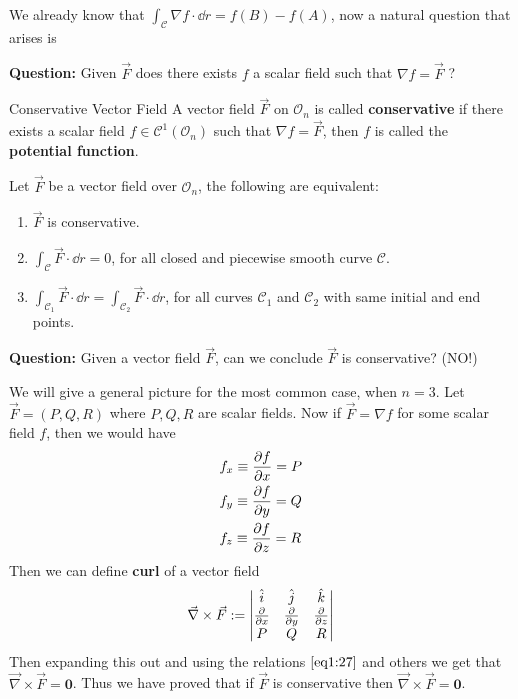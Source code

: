 \documentclass[Analysis-3]{subfiles}
\begin{document}
We already know that $\int_{\mathcal{C}} \nabla f \cdot \dd r = f(B) - f(A)$, now a natural question that arises is 

\textbf{Question:} Given $\vec{F}$ does there exists $f$ a scalar field such that $\nabla f = \vec{F}$ ?  

\begin{Def}{Conservative Vector Field}{}
    A vector field $\vec{F}$ on $\mathcal{O}_n$ is called \textbf{conservative} if there exists a scalar field $f \in \mathscr{C}^1(\mathcal{O}_n)$ such that $\nabla f = \vec{F}$, then $f$ is called the \textbf{potential function}. 
\end{Def}

\begin{Thm}{}{}\label{thm1:27}
    Let $\vec{F}$ be a vector field over $\mathcal{O}_n$, the following are equivalent: 
    \begin{enumerate}
        \item $\vec{F}$ is conservative.
        \item $\int_{\mathcal{C}}\vec{F} \cdot \dd r = 0$, for all closed and piecewise smooth curve $\mathcal{C}$.
        \item $\int_{\mathcal{C}_1} \vec{F} \cdot \dd r = \int_{\mathcal{C}_2} \vec{F} \cdot \dd r$, for all curves $\mathcal{C}_1$ and $\mathcal{C}_2$ with same initial and end points.
    \end{enumerate}
\end{Thm}

\textbf{Question:} Given a vector field $\vec{F}$, can we conclude $\vec{F}$ is conservative? (NO!)

We will give a general picture for the most common case, when $n = 3$. Let $\vec{F} = (P,Q,R)$ where $P,Q,R$ are scalar fields. Now if $\vec{F} = \nabla f$ for some scalar field $f$, then we would have 
\begin{align}\label{eq1:27}
    &f_x \equiv \pdv{f}{x} = P \\ 
    &f_y \equiv \pdv{f}{y} = Q \\ 
    &f_z \equiv \pdv{f}{z} = R
\end{align}
Then we can define \textbf{curl} of a vector field 
\[
    \vec{\nabla} \times \vec{F} := \begin{vmatrix}
        \hat{i} & \hat{j} & \hat{k} \\ 
        \pdv{}{x} & \pdv{}{y} & \pdv{}{z} \\ 
        P & Q & R
    \end{vmatrix}    
\]
Then expanding this out and using the relations $\ref{eq1:27}$ and others we get that $\vec{\nabla} \times \vec{F} = \mathbf{0}$. Thus we have proved that if $\vec{F}$ is conservative then $\vec{\nabla} \times \vec{F} = \mathbf{0}$.
\end{document}
